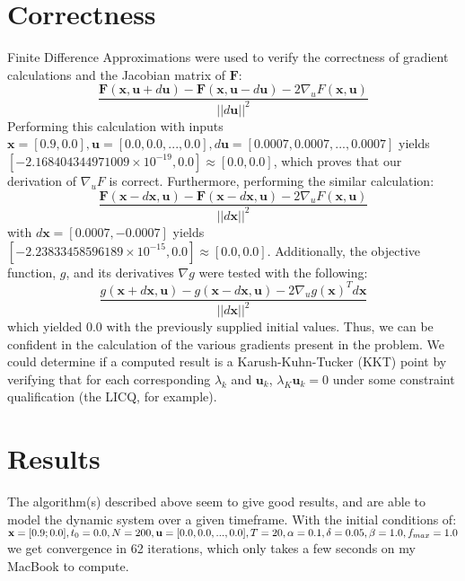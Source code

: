 \documentclass{article}
\begin{document}
\section{Correctness}
Finite Difference Approximations were used to verify the correctness of gradient calculations and the Jacobian matrix of $\textbf{F}$:
\begin{equation}
    \frac{\textbf{F}(\textbf{x}, \textbf{u}+d\textbf{u})-\textbf{F}(\textbf{x}, \textbf{u}-d\textbf{u})-2\nabla_{u}F(\textbf{x},\textbf{u})}{||d\textbf{u}||^2}
\end{equation}
Performing this calculation with inputs $\textbf{x}=[0.9,0.0],\textbf{u}=[0.0, 0.0, ..., 0.0],d\textbf{u}=[0.0007, 0.0007, ..., 0.0007]$ yields $[-2.168404344971009\times10^{-19}, 0.0] \approx [0.0,0.0]$, which proves that our derivation of $\nabla_{u}F$ is correct. Furthermore, performing the similar calculation:
\begin{equation}
    \frac{\textbf{F}(\textbf{x}-d\textbf{x}, \textbf{u})-\textbf{F}(\textbf{x}-d\textbf{x}, \textbf{u})-2\nabla_{u}F(\textbf{x},\textbf{u})}{||d\textbf{x}||^2}
\end{equation}
with $d\textbf{x}=[0.0007, -0.0007]$ yields $[-2.23833458596189\times10^{-15}, 0.0] \approx [0.0,0.0]$. Additionally, the objective function, $g$, and its derivatives $\nabla g$ were tested with the following:
\begin{equation}
    \frac{g(\textbf{x}+d\textbf{x}, \textbf{u})-g(\textbf{x}-d\textbf{x}, \textbf{u})-2\nabla_{u}g(\textbf{x})^T d\textbf{x}}{||d\textbf{x}||^2}
\end{equation}
which yielded 0.0 with the previously supplied initial values. Thus, we can be confident in the calculation of the various gradients present in the problem. We could determine if a computed result is a Karush-Kuhn-Tucker (KKT) point by verifying that for each corresponding $\lambda_{k}$ and $\textbf{u}_{k}$, $\lambda_{K} \textbf{u}_{k}=0$ under some constraint qualification (the LICQ, for example).
\section{Results}
The algorithm(s) described above seem to give good results, and are able to model the dynamic system over a given timeframe. With the initial conditions of: \\
$\textbf{x}=[0.9; 0.0],\\t_{0}=0.0,\\N=200,\\\textbf{u}=[0.0, 0.0, ..., 0.0], \\T=20, \\\alpha=0.1,\\\delta=0.05,\\ \beta=1.0,\\ f_{max}=1.0\\$ we get convergence in 62 iterations, which only takes a few seconds on my MacBook to compute.
\end{document}
